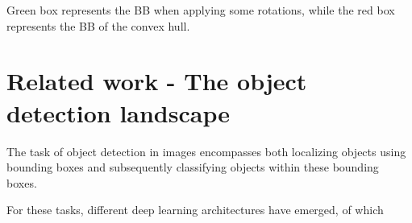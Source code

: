 \documentclass[a4paper]{article}
\begin{document}
\begin{minipage}{\columnwidth}
\makeatletter
\newcommand{\@captype}{figure}
\makeatother
\centering
\captionsetup[subfigure]{labelformat=empty}
\caption{Green box represents the BB when applying some rotations, while the red box represents the BB of the convex hull.}
\label{bb-ch}
\end{minipage}

\section{Related work - The object detection landscape}
The task of object detection in images encompasses both localizing objects using bounding boxes and subsequently classifying objects within these bounding boxes.

For these tasks, different deep learning architectures have emerged, of which 
\end{document}
